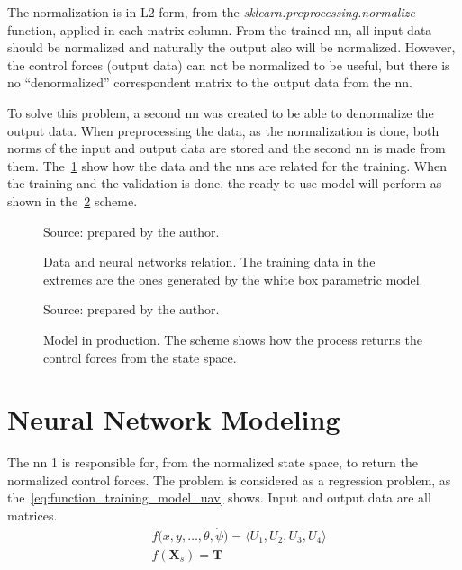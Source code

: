 The normalization is in L2 form, from the \emph{sklearn.preprocessing.normalize} function, applied in each matrix column.
From the trained \gls*{nn}, all input data should be normalized and naturally the output also will be normalized.
However, the control forces (output data) can not be normalized to be useful, but there is no ``denormalized'' correspondent matrix to the output data from the \gls*{nn}.

To solve this problem, a second \gls*{nn} was created to be able to denormalize the output data.
When preprocessing the data, as the normalization is done, both norms of the input and output data are stored and the second \gls*{nn} is made from them.
The~\cref{fig:nns_scheme} show how the data and the \glspl*{nn} are related for the training. 
When the training and the validation is done, the ready-to-use model will perform as shown in the~\cref{fig:full_scheme} scheme.

\begin{figure}[!htb]
    \centering
    \caption[Data and neural networks relation]{Data and neural networks relation. The training data in the extremes are the ones generated by the white box parametric model.}
    

    {\footnotesize Source: prepared by the author.}
    \label{fig:nns_scheme}
\end{figure}

\begin{figure}[!htb]
    \centering
    \caption[Model in production]{Model in production. The scheme shows how the process returns the control forces from the state space.}
    

    {\footnotesize Source: prepared by the author.}
    \label{fig:full_scheme}
\end{figure}

\section{Neural Network Modeling}

The \gls*{nn} 1 is responsible for, from the normalized state space, to return the normalized control forces.
The problem is considered as a regression problem, as the~\cref{eq:function_training_model_uav} shows. Input and output data are all matrices.
%
\begin{subequations}\label{eq:function_training_model_uav}
    \begin{align}
        &f\big(x,y,\ldots,\dot{\theta},\dot{\psi}\big) = \langle U_1, U_2, U_3, U_4 \rangle \\
        &f(\mathbf{X}_s) = \mathbf{T}
    \end{align}
\end{subequations}

